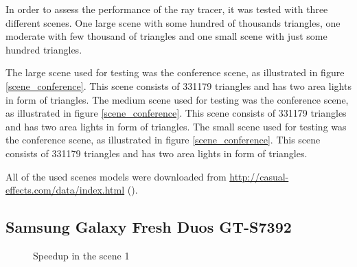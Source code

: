 \par
In order to assess the performance of the ray tracer, it was tested with three different scenes.
One large scene with some hundred of thousands triangles, one moderate with few thousand of triangles and one small scene with just some hundred triangles.

\par
The large scene used for testing was the conference scene, as illustrated in figure \ref{scene_conference}.
This scene consists of 331179 triangles and has two area lights in form of triangles.
The medium scene used for testing was the conference scene, as illustrated in figure \ref{scene_conference}.
This scene consists of 331179 triangles and has two area lights in form of triangles.
The small scene used for testing was the conference scene, as illustrated in figure \ref{scene_conference}.
This scene consists of 331179 triangles and has two area lights in form of triangles.

\par
All of the used scenes models were downloaded from
\url{http://casual-effects.com/data/index.html}  (\cite{McGuire2017Data}).

\subsection{Samsung Galaxy Fresh Duos GT-S7392}

\begin{figure}[H]
	\caption{Speedup in the scene 1}
\end{figure}

